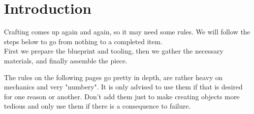 \documentclass[12pt,a4paper,openany,usenames,dvipsnames]{book}
\begin{document}
	

	\chapter{Introduction}
	Crafting comes up again and again, so it may need some rules. We will follow the steps below to go from nothing to a completed item.\\
	First we prepare the blueprint and tooling, then we gather the necessary materials, and finally assemble the piece.
	\par
	\begin{exampleblock}
		The rules on the following pages go pretty in depth,
		are rather heavy on mechanics and very "numbery".
		It is only advised to use them if that is desired for one reason or another.
		Don't add them just to make creating objects more tedious
			and only use them if there is a consequence to failure.
	\end{exampleblock}
\end{document}
